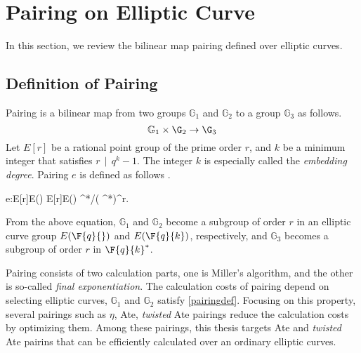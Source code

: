\section{Pairing on Elliptic Curve}

In this section, we review the bilinear map pairing defined over elliptic curves.

\subsection{Definition of Pairing} \label{secDefPairing} %

Pairing is a bilinear map from two groups $\mathbb{G}_1$ and $\mathbb{G}_2$ to a group $\mathbb{G}_3$ as follows.
\begin{equation}
\mathbb{G}_1 \times \G_2 \rightarrow \G_3 \nonumber
\end{equation}
Let $E[r]$ be a rational point group of the prime order $r$, and $k$ be a minimum integer that satisfies $r\,\mid \,q^k-1$.
The integer $k$ is especially called the {\it embedding degree}.
Pairing $e$ is defined as follows \cite{Hess}.

\be
e:\;E[r]\cap E(\Fq) \times E[r]\cap E() \rightarrow {} ^*/( ^*)^r. \label{pairingdef}
\ee

From the above equation, $\mathbb{G}_1$ and $\mathbb{G}_2$ become a subgroup of order $r$ in an elliptic curve group $E(\F{q}{})$ and $E(\F{q}{k})$, respectively, and $\mathbb{G}_3$ becomes a subgroup of order $r$ in $\F{q}{k}^*$.

Pairing consists of two calculation parts, one is Miller's algorithm, and the other is so-called {\it final exponentiation}. 
The calculation costs of pairing depend on selecting elliptic curves, $\mathbb{G}_1$ and $\mathbb{G}_2$ satisfy \eqref{pairingdef}.
Focusing on this property, several pairings such as $\eta$, Ate, {\it twisted} Ate pairings reduce the calculation costs by optimizing them.
Among these pairings, this thesis targets Ate and {\it twisted} Ate pairins that can be efficiently calculated over an ordinary elliptic curves.

